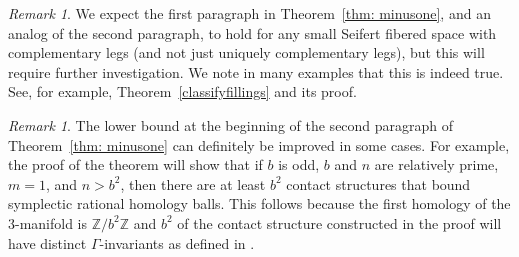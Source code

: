 \documentclass[11pt]{amsart}
\theoremstyle{plain}
\theoremstyle{definition}
\theoremstyle{remark}
\newtheorem{remark}[theorem]{Remark}
\numberwithin{theorem}{section}
\newcommand{\Z}{\mathbb{Z}}           %
\begin{document}
\begin{remark}
We expect the first paragraph in Theorem~\ref{thm: minusone}, and an analog of the second paragraph, to hold for any small Seifert fibered space with complementary legs (and not just uniquely complementary legs), but this will require further investigation. We note in many examples that this is indeed true. See, for example, Theorem~\ref{classifyfillings} and its proof. 
\end{remark}

\begin{remark}
The lower bound at the beginning of the second paragraph of Theorem~\ref{thm: minusone} can definitely be improved in some cases. For example, the proof of the theorem will show that if $b$ is odd, $b$ and $n$ are relatively prime, $m=1$, and $n>b^2$, then there are at least $b^2$ contact structures that bound symplectic rational homology balls. This follows because the first homology of the $3$-manifold is $\Z/b^2\Z$ and $b^2$ of the contact structure constructed in the proof will have distinct $\Gamma$-invariants as defined in \cite{Gompf98}. 
\end{remark}
\end{document}
